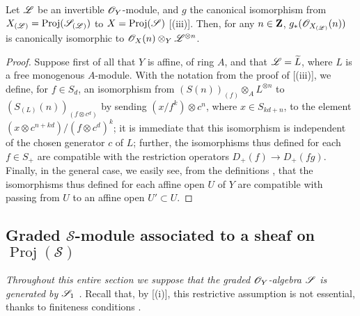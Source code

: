 \begin{proposition}[3.2.10]
\label{II.3.2.10}
Let $\mathscr{L}$ be an invertible $\mathscr{O}_Y$-module, and $g$ the canonical isomorphism from $X_{(\mathscr{L})}=\operatorname{Proj}(\mathscr{S}_{(\mathscr{L})})$ to $X=\operatorname{Proj}(\mathscr{S})$ [(iii)].
Then, for any $n\in\mathbf{Z}$, $g_*(\mathscr{O}_{X_{(\mathscr{L})}}(n))$ is canonically isomorphic to $\mathscr{O}_X(n)\otimes_Y\mathscr{L}^{\otimes n}$.
\end{proposition}

\begin{proof}
Suppose first of all that $Y$ is affine, of ring $A$, and that $\mathscr{L}=\widetilde{L}$, where $L$ is a free monogenous $A$-module.
With the notation from the proof of [(iii)], we define, for $f\in S_d$, an isomorphism from $(S(n))_{(f)}\otimes_A L^{\otimes n}$ to $(S_{(L)}(n))_{(f\otimes c^d)}$ by sending $(x/f^k)\otimes c^n$, where $x\in S_{kd+n}$, to the element $(x\otimes c^{n+kd})/(f\otimes c^d)^k$;
it is immediate that this isomorphism is independent of the chosen generator $c$ of $L$;
further, the isomorphisms thus defined for each $f\in S_+$ are compatible with the restriction operators $D_+(f)\to D_+(fg)$.
Finally, in the general case, we easily see, from the definitions , that the isomorphisms thus defined for each affine open $U$ of $Y$ are compatible with passing from $U$ to an affine open $U'\subset U$.
\end{proof}


\subsection{Graded $\mathcal{S}$-module associated to a sheaf on $\operatorname{Proj}(\mathcal{S})$}
\label{subsection:II.3.3}

\emph{Throughout this entire section we suppose that the graded $\mathscr{O}_Y$-algebra $\mathscr{S}$ is generated by $\mathscr{S}_1$ .}
Recall that, by [(i)], this restrictive assumption is not essential, thanks to finiteness conditions .

